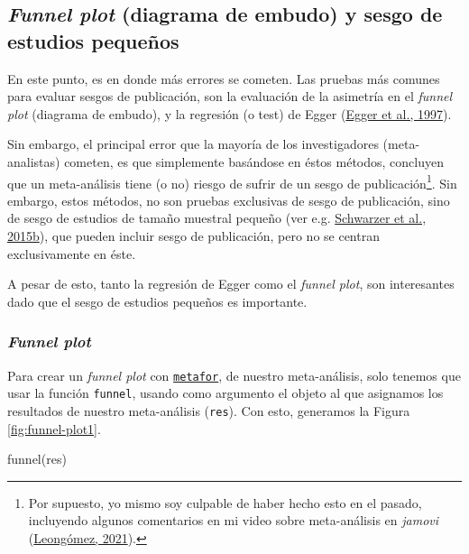\documentclass[
  bookmarksnumbered]{article}
\newenvironment{Shaded}{\begin{snugshade}}{\end{snugshade}}
\newcommand{\FunctionTok}[1]{\textcolor[rgb]{0.39,0.29,0.61}{#1}}
\newcommand{\NormalTok}[1]{\textcolor[rgb]{0.12,0.11,0.11}{#1}}
\begin{document}
\hypertarget{funnel-plot-diagrama-de-embudo-y-sesgo-de-estudios-pequeuxf1os}{%
\subsection{\texorpdfstring{\emph{Funnel plot} (diagrama de embudo) y sesgo de estudios pequeños}{Funnel plot (diagrama de embudo) y sesgo de estudios pequeños}}\label{funnel-plot-diagrama-de-embudo-y-sesgo-de-estudios-pequeuxf1os}}

En este punto, es en donde más errores se cometen. Las pruebas más comunes para evaluar sesgos de publicación, son la evaluación de la asimetría en el \emph{funnel plot} (diagrama de embudo), y la regresión (o test) de Egger (\protect\hyperlink{ref-eggerBiasMetaanalysisDetected1997}{Egger et al., 1997}).

Sin embargo, el principal error que la mayoría de los investigadores (meta-analistas) cometen, es que simplemente basándose en éstos métodos, concluyen que un meta-análisis tiene (o no) riesgo de sufrir de un sesgo de publicación\footnote{Por supuesto, yo mismo soy culpable de haber hecho esto en el pasado, incluyendo algunos comentarios en mi video sobre meta-análisis en \emph{jamovi} (\protect\hyperlink{ref-leongomezMetaanalysis2021}{Leongómez, 2021}).}. Sin embargo, estos métodos, no son pruebas exclusivas de sesgo de publicación, sino de sesgo de estudios de tamaño muestral pequeño (ver e.g. \protect\hyperlink{ref-schwarzerSmallStudyEffectsMetaAnalysis2015}{Schwarzer et al., 2015b}), que pueden incluir sesgo de publicación, pero no se centran exclusivamente en éste.

A pesar de esto, tanto la regresión de Egger como el \emph{funnel plot}, son interesantes dado que el sesgo de estudios pequeños es importante.

\hypertarget{funnel-plot}{%
\subsubsection{\texorpdfstring{\emph{Funnel plot}}{Funnel plot}}\label{funnel-plot}}

Para crear un \emph{funnel plot} con \href{https://www.metafor-project.org/doku.php}{\texttt{metafor}}, de nuestro meta-análisis, solo tenemos que usar la función \texttt{funnel}, usando como argumento el objeto al que asignamos los resultados de nuestro meta-análisis (\texttt{res}). Con esto, generamos la Figura \ref{fig:funnel-plot1}.

\begin{Shaded}
\begin{Highlighting}[]
\FunctionTok{funnel}\NormalTok{(res)}
\end{Highlighting}
\end{Shaded}
\end{document}
